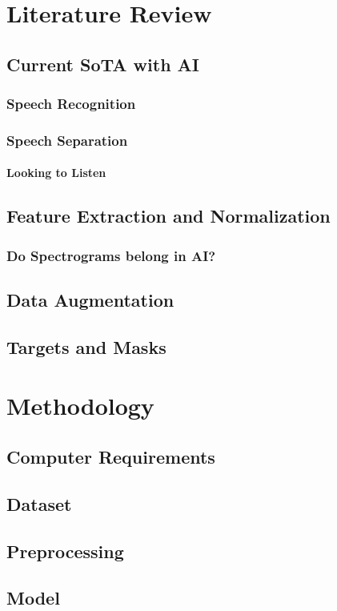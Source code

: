 \documentclass{book}
\begin{document}
\chapter{Literature Review}
  \section{Current SoTA with AI}
    \subsection{Speech Recognition}
    \subsection{Speech Separation}
      \subsubsection{Looking to Listen}
  \section{Feature Extraction and Normalization}
    \subsection{Do Spectrograms belong in AI?}
  \section{Data Augmentation}
  \section{Targets and Masks}

\chapter{Methodology}
  \section{Computer Requirements}
  \section{Dataset}
  \section{Preprocessing}
  \section{Model}
\end{document}
